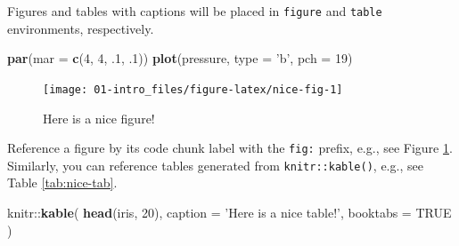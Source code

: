 \documentclass[]{book}
\newenvironment{Shaded}{\begin{snugshade}}{\end{snugshade}}
\newcommand{\KeywordTok}[1]{\textcolor[rgb]{0.13,0.29,0.53}{\textbf{{#1}}}}
\newcommand{\DataTypeTok}[1]{\textcolor[rgb]{0.13,0.29,0.53}{{#1}}}
\newcommand{\DecValTok}[1]{\textcolor[rgb]{0.00,0.00,0.81}{{#1}}}
\newcommand{\StringTok}[1]{\textcolor[rgb]{0.31,0.60,0.02}{{#1}}}
\newcommand{\OtherTok}[1]{\textcolor[rgb]{0.56,0.35,0.01}{{#1}}}
\newcommand{\NormalTok}[1]{{#1}}
\theoremstyle{definition}
\theoremstyle{definition}
\theoremstyle{remark}
\begin{document}
Figures and tables with captions will be placed in \texttt{figure} and
\texttt{table} environments, respectively.

\begin{Shaded}
\begin{Highlighting}[]
\KeywordTok{par}\NormalTok{(}\DataTypeTok{mar =} \KeywordTok{c}\NormalTok{(}\DecValTok{4}\NormalTok{, }\DecValTok{4}\NormalTok{, .}\DecValTok{1}\NormalTok{, .}\DecValTok{1}\NormalTok{))}
\KeywordTok{plot}\NormalTok{(pressure, }\DataTypeTok{type =} \StringTok{'b'}\NormalTok{, }\DataTypeTok{pch =} \DecValTok{19}\NormalTok{)}
\end{Highlighting}
\end{Shaded}

\begin{figure}

{\centering \texttt{[image: 01-intro\_files/figure-latex/nice-fig-1]} 

}

\caption{Here is a nice figure!}\label{fig:nice-fig}
\end{figure}

Reference a figure by its code chunk label with the \texttt{fig:}
prefix, e.g., see Figure \ref{fig:nice-fig}. Similarly, you can
reference tables generated from \texttt{knitr::kable()}, e.g., see Table
\ref{tab:nice-tab}.

\begin{Shaded}
\begin{Highlighting}[]
\NormalTok{knitr::}\KeywordTok{kable}\NormalTok{(}
  \KeywordTok{head}\NormalTok{(iris, }\DecValTok{20}\NormalTok{), }\DataTypeTok{caption =} \StringTok{'Here is a nice table!'}\NormalTok{,}
  \DataTypeTok{booktabs =} \OtherTok{TRUE}
\NormalTok{)}
\end{Highlighting}
\end{Shaded}
\end{document}
